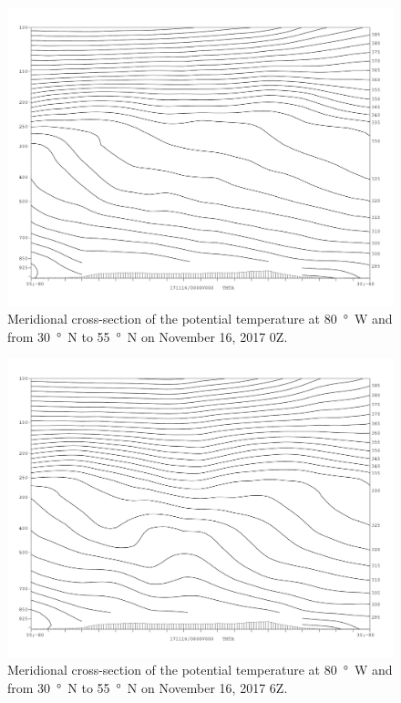 \documentclass[11pt]{article}
\begin{document}
\begin{figure}[h!]
  \centering
  \includegraphics[width=\textwidth]{thta_171116_0Z_NS_lon80W}
  \caption{Meridional cross-section of the potential temperature at \SI{80}{\degree W} and from \SI{30}{\degree N} to \SI{55}{\degree N} on November 16, 2017 0Z.}
  \label{fig:thta_171116_0Z_NS_lon80W}
\end{figure}

\begin{figure}[h!]
  \centering
  \includegraphics[width=\textwidth]{thta_171116_6Z_NS}
  \caption{Meridional cross-section of the potential temperature at \SI{80}{\degree W} and from \SI{30}{\degree N} to \SI{55}{\degree N} on November 16, 2017 6Z.}
  \label{fig:thta_171116_6Z_NS}
\end{figure}
\end{document}
